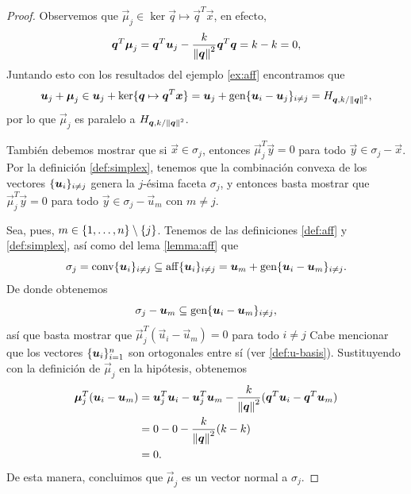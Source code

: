 \begin{proof}
	Observemos que $\vec{\mu}_j \in \ker{\vec{q} \mapsto \vec{q}^T\vec{x}}$, en efecto,
	\begin{equation*}
		\boldsymbol{q}^T\boldsymbol{\mu}_j = \boldsymbol{q}^T\boldsymbol{u}_j - \frac{k}{\left\lVert \boldsymbol{q} \right\rVert^2}\boldsymbol{q}^T\boldsymbol{q}
		 = k - k = 0,
	\end{equation*}
	Juntando esto con los resultados del ejemplo \ref{ex:aff} encontramos que
	\begin{equation*}
		\boldsymbol{u}_j + \boldsymbol{\mu}_j \in \boldsymbol{u}_j + \operatorname{ker}\lbrace \boldsymbol{q} \mapsto \boldsymbol{q}^T\boldsymbol{x} \rbrace = \boldsymbol{u}_j + \operatorname{gen}\lbrace \boldsymbol{u}_i -
			\boldsymbol{u}_j \rbrace_{i \neq j} = H_{\boldsymbol{q}, k/\left\lVert \boldsymbol{q} \right\rVert^{2}},
	\end{equation*}
	por lo que $\vec{\mu}_j$ es paralelo a $H_{\boldsymbol{q}, k/\left\lVert \boldsymbol{q} \right\rVert^{2}}$.

	También debemos mostrar que si $\vec{x} \in \sigma_j$, entonces
	$\vec{\mu}_j^T\vec{y} = 0$ para todo $\vec{y} \in \sigma_j - \vec{x}$. Por
	la definición \ref{def:simplex}, tenemos que la combinación convexa de  los
	vectores $\lbrace \boldsymbol{u}_i \rbrace_{i \neq j}$ genera la $j$-ésima faceta
	$\sigma_j$, y entonces basta mostrar que $\vec{\mu}_j^T\vec{y} = 0$ para
	todo $\vec{y} \in \sigma_j - \vec{u}_m$ con $m \neq j$.

	Sea, pues, $m \in \lbrace 1, \ldots, n \rbrace \setminus \lbrace j \rbrace$. Tenemos de las definiciones
	\ref{def:aff} y \ref{def:simplex}, así como del lema \ref{lemma:aff} que
	\begin{equation*}
		\sigma_j = \operatorname{conv}\lbrace \boldsymbol{u}_i \rbrace_{i \neq j} \subseteq
		\operatorname{aff}\lbrace \boldsymbol{u}_i \rbrace_{i \neq j}
		= \boldsymbol{u}_m + \operatorname{gen}\lbrace \boldsymbol{u}_i - \boldsymbol{u}_m \rbrace_{i \neq j}.
	\end{equation*}
	De donde obtenemos
	\begin{equation*}
		\sigma_j - \boldsymbol{u}_m \subseteq \operatorname{gen}\lbrace \boldsymbol{u}_i - \boldsymbol{u}_m \rbrace_{i \neq j},
	\end{equation*}
	así que basta mostrar que $\vec{\mu}_j^T(\vec{u}_i - \vec{u}_m) = 0$ para todo $i \neq j$ Cabe
	mencionar que los vectores $\lbrace \boldsymbol{u}_i \rbrace_{i=1}^{n}$ son ortogonales entre sí (ver
	\eqref{def:u-basis}). Sustituyendo con la definición de $\vec{\mu}_j$ en la hipótesis, obtenemos
	\begin{align*}
		\boldsymbol{\mu}_j^T(\boldsymbol{u}_i - \boldsymbol{u}_m)
		&=
		\boldsymbol{u}_j^T\boldsymbol{u}_i - \boldsymbol{u}_j^T\boldsymbol{u}_m - \frac{k}{\left\lVert \boldsymbol{q} \right\rVert^2}(\boldsymbol{q}^T\boldsymbol{u}_i
		- \boldsymbol{q}^T\boldsymbol{u}_m) \\
		&= 0 - 0 -\frac{k}{\left\lVert \boldsymbol{q} \right\rVert^2}(k - k) \\
		&= 0.
	\end{align*}
	De esta manera, concluimos que $\vec{\mu}_j$ es un vector normal a $\sigma_j$.
\end{proof}

